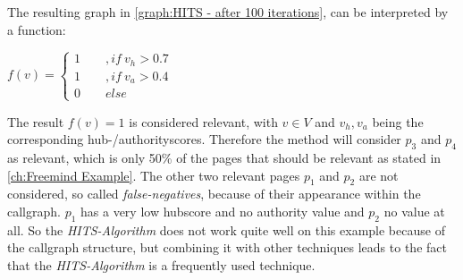 The resulting graph in \autoref{graph:HITS - after 100 iterations}, can be interpreted by a function:
\begin{center}
	$f(v) = \begin{cases} 1 \qquad ,if \ v_h>0.7\\ 1 \qquad ,if \ v_a > 0.4 \\ 0 \qquad else \end{cases}$
\end{center}
The result $f(v)=1$ is considered relevant, with  $v\in V$ and $v_h, v_a$ being the corresponding hub-/authorityscores. Therefore the method will consider $p_3$ and $p_4$ as relevant, which is only 50\% of the pages that should be relevant as stated in \autoref{ch:Freemind Example}. The other two relevant pages $p_1$ and $p_2$ are not considered, so called \emph{false-negatives}, because of their appearance within the callgraph. $p_1$ has a very low hubscore and no authority value and $p_2$ no value at all. So the \emph{HITS-Algorithm} does not work quite well on this example because of the callgraph structure, but combining it with other techniques leads to the fact that the \emph{HITS-Algorithm} is a frequently used technique.
